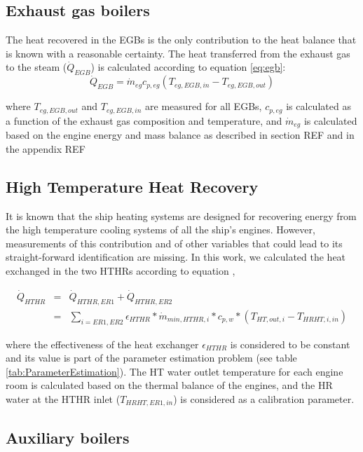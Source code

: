 \documentclass[]{article}
\begin{document}
\subsection{Exhaust gas boilers}

The heat recovered in the EGBs is the only contribution to the heat balance that is known with a reasonable certainty. The heat transferred from the exhaust gas to the steam ($\dot{Q}_{EGB}$) is calculated according to equation \ref{eq:egb}:
\begin{equation}
\dot{Q}_{EGB} = \dot{m}_{eg} c_{p,eg} (T_{eg,EGB,in} - T_{eg,EGB,out})
\end{equation}\label{eq:egb}

where $T_{eg,EGB,out}$ and $T_{eg,EGB,in}$ are measured for all EGBs, $c_{p,eg}$ is calculated as a function of the exhaust gas composition and temperature, and $ \dot{m}_{eg} $ is calculated based on the engine energy and mass balance as described in section REF and in the appendix REF

\subsection{High Temperature Heat Recovery}

It is known that the ship heating systems are designed for recovering energy from the high temperature cooling systems of all the ship's engines. However, measurements of this contribution and of other variables that could lead to its straight-forward identification are missing. In this work, we calculated the heat exchanged in the two HTHRs according to equation \label{eqn:HTHR2},

\begin{eqnarray}
\dot{Q}_{HTHR} & = & \dot{Q}_{HTHR,ER1} + \dot{Q}_{HTHR,ER2} \label{eqn:HTHR1} \\
 & = & \sum_{i=ER1,ER2}{\epsilon_{HTHR} * \dot{m}_{min,HTHR,i} * c_{p,w} * (T_{HT,out,i} - T_{HRHT,i,in})} \label{eqn:HTHR2}
\end{eqnarray}

where the effectiveness of the heat exchanger $\epsilon_{HTHR}$ is considered to be constant and its value is part of the parameter estimation problem (see table \ref{tab:ParameterEstimation}). The HT water outlet temperature for each engine room is calculated based on the thermal balance of the engines, and the HR water at the HTHR inlet ($T_{HRHT,ER1,in}$) is considered as a calibration parameter. 

\subsection{Auxiliary boilers}
\end{document}
